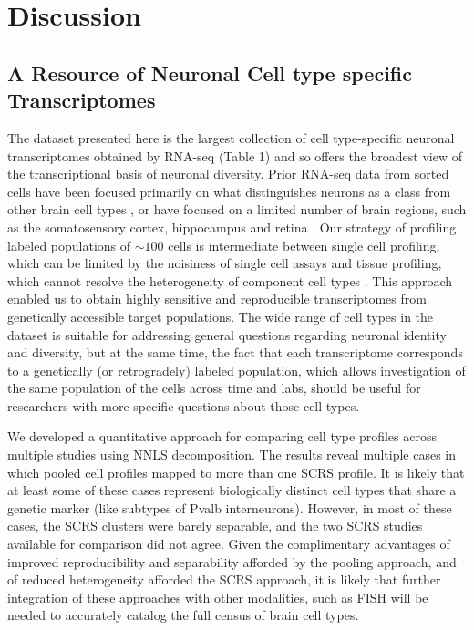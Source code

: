 
\section{Discussion}

\subsection{A Resource of Neuronal Cell type specific Transcriptomes}
The dataset presented here is the largest collection of cell type-specific neuronal transcriptomes obtained by RNA-seq (Table 1) and so offers the broadest view of the transcriptional basis of neuronal diversity. Prior RNA-seq data from sorted cells have been focused primarily on what distinguishes neurons as a class from other brain cell types \citep{Zhang_2014}, or have focused on a limited number of brain regions, such as the somatosensory cortex, hippocampus  \citep{Zeisel_2015} and retina \citep{Macosko_2015}. Our strategy of profiling labeled populations of $\sim100$ cells is intermediate between single cell profiling, which can be limited by the noisiness of single cell assays \citep{Marinov_2013} and tissue profiling, which cannot resolve the heterogeneity of component cell types \citep{Nelson_2006}. This approach enabled us to obtain highly sensitive and reproducible transcriptomes from genetically accessible target populations. The wide range of cell types in the dataset is suitable for addressing general questions regarding neuronal identity and diversity, but at the same time, the fact that each transcriptome corresponds to a genetically (or retrogradely) labeled population, which allows investigation of the same population of the cells across time and labs, should be useful for researchers with more specific questions about those cell types.

We developed a quantitative approach for comparing cell type profiles across multiple studies using NNLS decomposition. The results reveal multiple cases in which pooled cell profiles mapped to more than one SCRS profile. It is likely that at least some of these cases represent biologically distinct cell types that share a genetic marker (like subtypes of Pvalb interneurons). However, in most of these cases, the SCRS clusters were barely separable, and the two SCRS studies available for comparison did not agree. Given the complimentary advantages of improved reproducibility and separability afforded by the pooling approach, and of reduced heterogeneity afforded the SCRS approach, it is likely that further integration of these approaches with other modalities, such as FISH \citep{Moffitt_2016} will be needed to accurately catalog the full census of brain cell types. 

